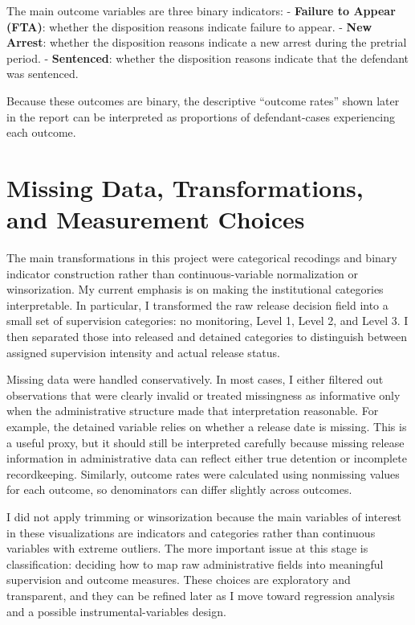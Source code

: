 \documentclass[
  11pt,
]{article}
\begin{document}
The main outcome variables are three binary indicators: -
\textbf{Failure to Appear (FTA)}: whether the disposition reasons
indicate failure to appear. - \textbf{New Arrest}: whether the
disposition reasons indicate a new arrest during the pretrial period. -
\textbf{Sentenced}: whether the disposition reasons indicate that the
defendant was sentenced.

Because these outcomes are binary, the descriptive ``outcome rates''
shown later in the report can be interpreted as proportions of
defendant-cases experiencing each outcome.

\section{Missing Data, Transformations, and Measurement
Choices}\label{missing-data-transformations-and-measurement-choices}

The main transformations in this project were categorical recodings and
binary indicator construction rather than continuous-variable
normalization or winsorization. My current emphasis is on making the
institutional categories interpretable. In particular, I transformed the
raw release decision field into a small set of supervision categories:
no monitoring, Level 1, Level 2, and Level 3. I then separated those
into released and detained categories to distinguish between assigned
supervision intensity and actual release status.

Missing data were handled conservatively. In most cases, I either
filtered out observations that were clearly invalid or treated
missingness as informative only when the administrative structure made
that interpretation reasonable. For example, the detained variable
relies on whether a release date is missing. This is a useful proxy, but
it should still be interpreted carefully because missing release
information in administrative data can reflect either true detention or
incomplete recordkeeping. Similarly, outcome rates were calculated using
nonmissing values for each outcome, so denominators can differ slightly
across outcomes.

I did not apply trimming or winsorization because the main variables of
interest in these visualizations are indicators and categories rather
than continuous variables with extreme outliers. The more important
issue at this stage is classification: deciding how to map raw
administrative fields into meaningful supervision and outcome measures.
These choices are exploratory and transparent, and they can be refined
later as I move toward regression analysis and a possible
instrumental-variables design.
\end{document}
